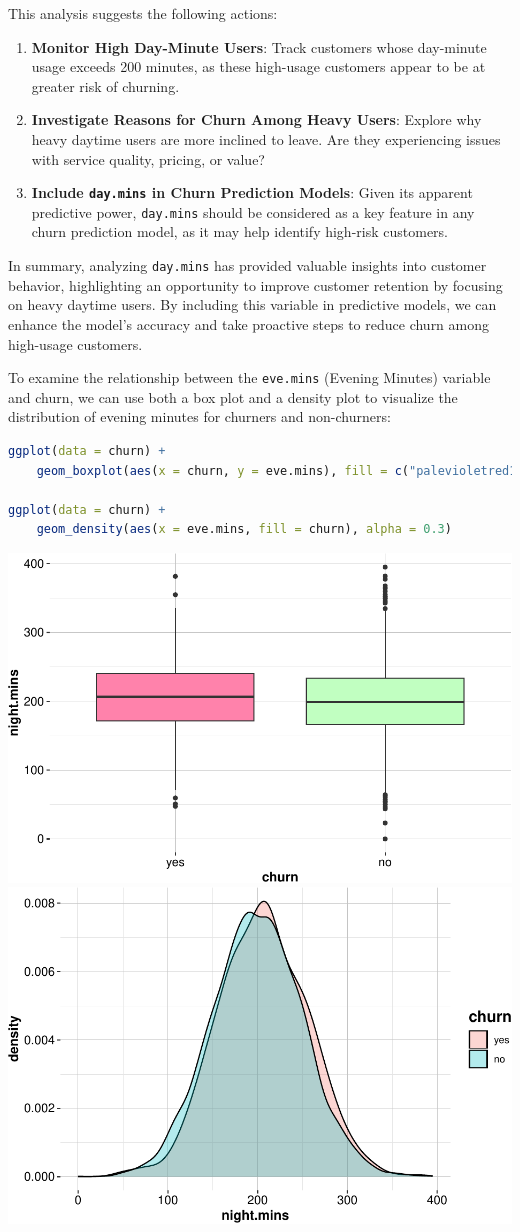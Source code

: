 \documentclass[
]{book}
\newcommand{\passthrough}[1]{#1}
\providecommand{\tightlist}{%
  \setlength{\itemsep}{0pt}\setlength{\parskip}{0pt}}
\theoremstyle{definition}
\theoremstyle{definition}
\theoremstyle{definition}
\theoremstyle{definition}
\theoremstyle{remark}
\begin{document}
This analysis suggests the following actions:

\begin{enumerate}
\def\labelenumi{\arabic{enumi}.}
\tightlist
\item
  \textbf{Monitor High Day-Minute Users}: Track customers whose day-minute usage exceeds 200 minutes, as these high-usage customers appear to be at greater risk of churning.
\item
  \textbf{Investigate Reasons for Churn Among Heavy Users}: Explore why heavy daytime users are more inclined to leave. Are they experiencing issues with service quality, pricing, or value?
\item
  \textbf{Include \passthrough{\lstinline!day.mins!} in Churn Prediction Models}: Given its apparent predictive power, \passthrough{\lstinline!day.mins!} should be considered as a key feature in any churn prediction model, as it may help identify high-risk customers.
\end{enumerate}

In summary, analyzing \passthrough{\lstinline!day.mins!} has provided valuable insights into customer behavior, highlighting an opportunity to improve customer retention by focusing on heavy daytime users. By including this variable in predictive models, we can enhance the model's accuracy and take proactive steps to reduce churn among high-usage customers.

To examine the relationship between the \passthrough{\lstinline!eve.mins!} (Evening Minutes) variable and churn, we can use both a box plot and a density plot to visualize the distribution of evening minutes for churners and non-churners:

\begin{lstlisting}[language=R]
ggplot(data = churn) +
    geom_boxplot(aes(x = churn, y = eve.mins), fill = c("palevioletred1", "darkseagreen1"))

ggplot(data = churn) +
    geom_density(aes(x = eve.mins, fill = churn), alpha = 0.3)
\end{lstlisting}

\includegraphics[width=0.5\linewidth]{EDA_files/figure-latex/unnamed-chunk-13-1} \includegraphics[width=0.5\linewidth]{EDA_files/figure-latex/unnamed-chunk-13-2}
\end{document}
